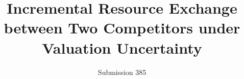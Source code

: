 \documentclass[format=acmsmall, review=false]{acmart} %
\title[Incremental Resource Exchange between Two Competitors under Valuation Uncertainty]{Incremental Resource Exchange between Two Competitors under Valuation Uncertainty}
\author{Submission 385}
\begin{document}
\begin{titlepage}

\maketitle

\vspace{1cm}
\setcounter{tocdepth}{1} %
\tableofcontents

\end{titlepage}


%





\newpage


\appendix

% 
% 

\end{document}
